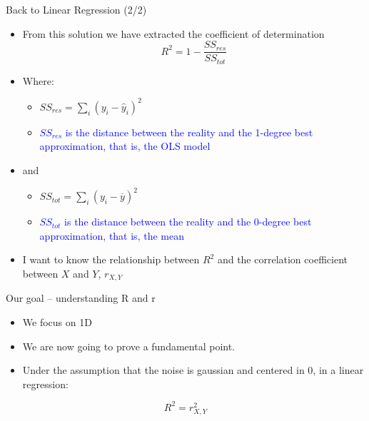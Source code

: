 \documentclass{beamer}
\begin{document}
\begin{frame}
{\centerline{Back to Linear Regression (2/2)}}
\begin{itemize}
\item From this solution we have extracted the coefficient of determination
$$R^2 = 1 - \frac{SS_{res}}{SS_{tot}}$$
\item Where: 
\begin{itemize}
\item $SS_{res} = \sum_i (y_i - \hat{y}_i)^2$ 
\item \textcolor{blue}{$SS_{res} $ is the distance between the reality and the 1-degree best approximation, that is, the OLS model}
\end{itemize}
\item and
\begin{itemize}
\item $SS_{tot} = \sum_i (y_i - \overline{y})^2$
\item  \textcolor{blue}{$SS_{tot}$ is the distance between the reality and the 0-degree best approximation, that is, the mean}
\end{itemize}

\item I want to know the relationship between $R^2$ and the correlation coefficient between $X$ and $Y$, $r_{X,Y}$
\end{itemize}
\end{frame}

\begin{frame}
{\centerline{Our goal -- understanding R and r}}
\begin{itemize}
\item We focus on 1D
\item We are now going to prove a fundamental point.
\item Under the assumption that the noise is gaussian and centered in 0, in a linear regression:
\end{itemize}
$$R^2 = r_{X,Y}^2$$
\end{frame}
\end{document}
